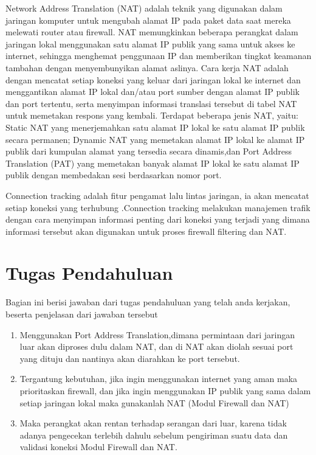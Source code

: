 Network Address Translation (NAT) adalah teknik yang digunakan dalam jaringan komputer untuk mengubah 
alamat IP pada paket data saat mereka melewati router atau firewall. NAT memungkinkan beberapa 
perangkat dalam jaringan lokal menggunakan satu alamat IP publik yang sama untuk akses ke internet, sehingga 
menghemat penggunaan IP dan memberikan tingkat keamanan tambahan dengan menyembunyikan alamat aslinya. 
Cara kerja NAT adalah dengan mencatat setiap koneksi yang keluar dari jaringan lokal ke internet dan 
menggantikan alamat IP lokal dan/atau port sumber dengan alamat IP publik dan port tertentu, serta 
menyimpan informasi translasi tersebut di tabel NAT untuk memetakan respons yang kembali. Terdapat 
beberapa jenis NAT, yaitu: Static NAT yang menerjemahkan satu alamat IP lokal ke satu alamat IP 
publik secara permanen; Dynamic NAT yang memetakan alamat IP lokal ke alamat IP publik dari kumpulan 
alamat yang tersedia secara dinamis,dan Port Address Translation (PAT) yang 
memetakan banyak alamat IP lokal ke satu alamat IP publik dengan membedakan sesi berdasarkan nomor 
port.

Connection tracking adalah fitur pengamat lalu lintas jaringan, ia akan mencatat setiap koneksi yang terhubung
.Connection tracking melakukan manajemen trafik dengan cara menyimpan informasi penting dari koneksi yang 
terjadi yang dimana informasi tersebut akan digunakan untuk proses firewall filtering dan NAT.
\section{Tugas Pendahuluan}
Bagian ini berisi jawaban dari tugas pendahuluan yang telah anda kerjakan, beserta penjelasan dari jawaban tersebut
\begin{enumerate}
	\item Menggunakan Port Address Translation,dimana permintaan dari jaringan luar akan diproses dulu dalam 
	NAT, dan di NAT akan diolah sesuai port yang dituju dan nantinya akan diarahkan ke port tersebut. 
	\item Tergantung kebutuhan, jika ingin menggunakan internet yang aman maka prioritaskan firewall, dan jika
	ingin menggunakan IP publik yang sama dalam setiap jaringan lokal maka gunakanlah NAT (Modul Firewall dan NAT)
	\item Maka perangkat akan rentan terhadap serangan dari luar, karena tidak adanya pengecekan terlebih 
	dahulu sebelum pengiriman suatu data dan validasi koneksi {Modul Firewall dan NAT}. 
\end{enumerate}